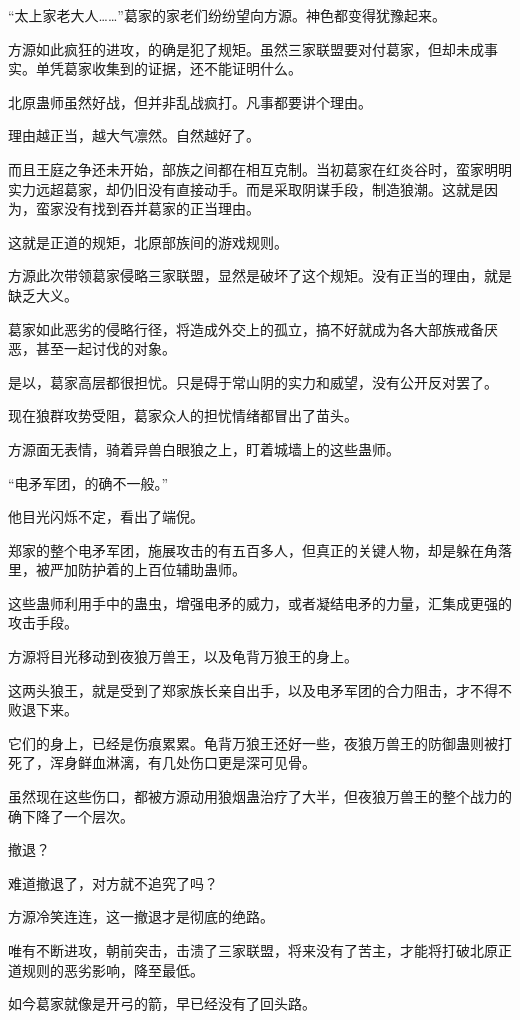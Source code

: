 \begin{this_body}
“太上家老大人……”葛家的家老们纷纷望向方源。神色都变得犹豫起来。

方源如此疯狂的进攻，的确是犯了规矩。虽然三家联盟要对付葛家，但却未成事实。单凭葛家收集到的证据，还不能证明什么。

北原蛊师虽然好战，但并非乱战疯打。凡事都要讲个理由。

理由越正当，越大气凛然。自然越好了。

而且王庭之争还未开始，部族之间都在相互克制。当初葛家在红炎谷时，蛮家明明实力远超葛家，却仍旧没有直接动手。而是采取阴谋手段，制造狼潮。这就是因为，蛮家没有找到吞并葛家的正当理由。

这就是正道的规矩，北原部族间的游戏规则。

方源此次带领葛家侵略三家联盟，显然是破坏了这个规矩。没有正当的理由，就是缺乏大义。

葛家如此恶劣的侵略行径，将造成外交上的孤立，搞不好就成为各大部族戒备厌恶，甚至一起讨伐的对象。

是以，葛家高层都很担忧。只是碍于常山阴的实力和威望，没有公开反对罢了。

现在狼群攻势受阻，葛家众人的担忧情绪都冒出了苗头。

方源面无表情，骑着异兽白眼狼之上，盯着城墙上的这些蛊师。

“电矛军团，的确不一般。”

他目光闪烁不定，看出了端倪。

郑家的整个电矛军团，施展攻击的有五百多人，但真正的关键人物，却是躲在角落里，被严加防护着的上百位辅助蛊师。

这些蛊师利用手中的蛊虫，增强电矛的威力，或者凝结电矛的力量，汇集成更强的攻击手段。

方源将目光移动到夜狼万兽王，以及龟背万狼王的身上。

这两头狼王，就是受到了郑家族长亲自出手，以及电矛军团的合力阻击，才不得不败退下来。

它们的身上，已经是伤痕累累。龟背万狼王还好一些，夜狼万兽王的防御蛊则被打死了，浑身鲜血淋漓，有几处伤口更是深可见骨。

虽然现在这些伤口，都被方源动用狼烟蛊治疗了大半，但夜狼万兽王的整个战力的确下降了一个层次。

撤退？

难道撤退了，对方就不追究了吗？

方源冷笑连连，这一撤退才是彻底的绝路。

唯有不断进攻，朝前突击，击溃了三家联盟，将来没有了苦主，才能将打破北原正道规则的恶劣影响，降至最低。

如今葛家就像是开弓的箭，早已经没有了回头路。


\end{this_body}
